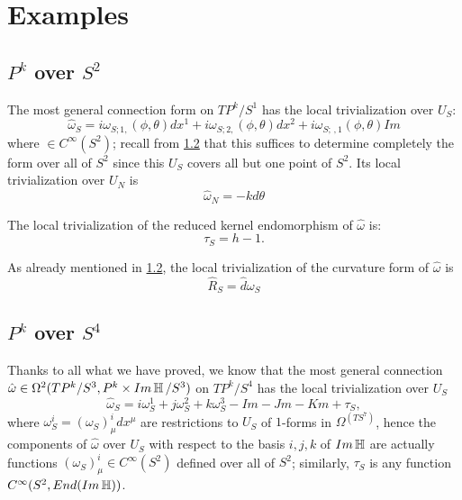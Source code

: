 \section{Examples}

\subsection{$P^k$ over $S^2$}

The most general connection form on $TP^k/S^1$ has the local trivialization over $U_S$:
\begin{equation}
    \hat \omega_S = i\omega_{S; 1,}(\phi, \theta) dx^1 + i\omega_{S; 2,}(\phi, \theta) dx^2 + i\omega_{S; \, ,1}(\phi, \theta) Im
\end{equation}
where $ \in C^\infty(S^2)$; recall from \ref{} that this suffices to determine completely the form over all of $S^2$ since this $U_S$ covers all but one point of $S^2$. Its local trivialization over $U_N$ is
\begin{equation}
     \hat \omega_N = - kd\theta
\end{equation}

The local trivialization of the reduced kernel endomorphism of $\hat \omega$ is:
\begin{equation}
    \tau_S = h - 1.
\end{equation}

As already mentioned in \ref{}, the local trivialization of the curvature form of $\hat \omega$ is
\begin{equation}
    \hat R_S = \hat d \omega_S 
\end{equation}


\subsection{$P^k$ over $S^4$}

Thanks to all what we have proved, we know that the most general connection $\hat \omega \in \Omega^2(TP^k/S^3, P^k \times Im \operatorname{\mathbb{H}}/S^3)$ on $TP^k/S^4$ has the local trivialization over $U_S$
\begin{equation}
    \hat \omega_S = i \omega_S^1 + j \omega_S^2 + k \omega_S^3 - Im - Jm - Km + \tau_S,
\end{equation}
where $\omega_S^i = (\omega_S)^i_\mu dx^\mu$ are restrictions to $U_S$ of $1$-forms in $\Omega^(TS^7)$, hence the components of $\hat \omega$ over $U_S$ with respect to the basis $i, j, k$ of $Im \operatorname{\mathbb{H}}$ are actually functions $(\omega_S)^i_\mu \in C^\infty(S^2)$ defined over all of $S^2$; similarly, $\tau_S$ is any function $C^\infty(S^2, End(Im \operatorname{\mathbb{H}}))$.


